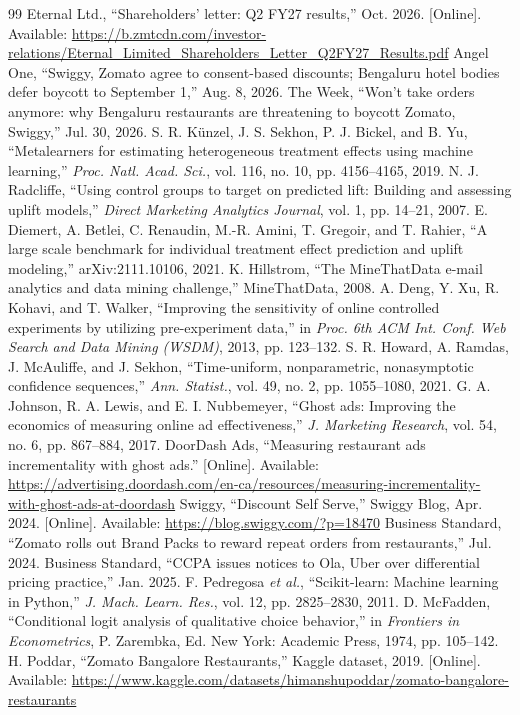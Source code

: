 \documentclass[conference]{IEEEtran}
\begin{document}
\begin{thebibliography}{99}
 Eternal Ltd., ``Shareholders' letter: Q2 FY27 results,'' Oct. 2026. [Online]. Available: \url{https://b.zmtcdn.com/investor-relations/Eternal_Limited_Shareholders_Letter_Q2FY27_Results.pdf}
 Angel One, ``Swiggy, Zomato agree to consent-based discounts; Bengaluru hotel bodies defer boycott to September 1,'' Aug. 8, 2026.
 The Week, ``Won't take orders anymore: why Bengaluru restaurants are threatening to boycott Zomato, Swiggy,'' Jul. 30, 2026.
 S. R. K\"unzel, J. S. Sekhon, P. J. Bickel, and B. Yu, ``Metalearners for estimating heterogeneous treatment effects using machine learning,'' \emph{Proc. Natl. Acad. Sci.}, vol. 116, no. 10, pp. 4156--4165, 2019.
 N. J. Radcliffe, ``Using control groups to target on predicted lift: Building and assessing uplift models,'' \emph{Direct Marketing Analytics Journal}, vol. 1, pp. 14--21, 2007.
 E. Diemert, A. Betlei, C. Renaudin, M.-R. Amini, T. Gregoir, and T. Rahier, ``A large scale benchmark for individual treatment effect prediction and uplift modeling,'' arXiv:2111.10106, 2021.
 K. Hillstrom, ``The MineThatData e-mail analytics and data mining challenge,'' MineThatData, 2008.
 A. Deng, Y. Xu, R. Kohavi, and T. Walker, ``Improving the sensitivity of online controlled experiments by utilizing pre-experiment data,'' in \emph{Proc. 6th ACM Int. Conf. Web Search and Data Mining (WSDM)}, 2013, pp. 123--132.
 S. R. Howard, A. Ramdas, J. McAuliffe, and J. Sekhon, ``Time-uniform, nonparametric, nonasymptotic confidence sequences,'' \emph{Ann. Statist.}, vol. 49, no. 2, pp. 1055--1080, 2021.
 G. A. Johnson, R. A. Lewis, and E. I. Nubbemeyer, ``Ghost ads: Improving the economics of measuring online ad effectiveness,'' \emph{J. Marketing Research}, vol. 54, no. 6, pp. 867--884, 2017.
 DoorDash Ads, ``Measuring restaurant ads incrementality with ghost ads.'' [Online]. Available: \url{https://advertising.doordash.com/en-ca/resources/measuring-incrementality-with-ghost-ads-at-doordash}
 Swiggy, ``Discount Self Serve,'' Swiggy Blog, Apr. 2024. [Online]. Available: \url{https://blog.swiggy.com/?p=18470}
 Business Standard, ``Zomato rolls out Brand Packs to reward repeat orders from restaurants,'' Jul. 2024.
 Business Standard, ``CCPA issues notices to Ola, Uber over differential pricing practice,'' Jan. 2025.
 F. Pedregosa \emph{et al.}, ``Scikit-learn: Machine learning in Python,'' \emph{J. Mach. Learn. Res.}, vol. 12, pp. 2825--2830, 2011.
 D. McFadden, ``Conditional logit analysis of qualitative choice behavior,'' in \emph{Frontiers in Econometrics}, P. Zarembka, Ed. New York: Academic Press, 1974, pp. 105--142.
 H. Poddar, ``Zomato Bangalore Restaurants,'' Kaggle dataset, 2019. [Online]. Available: \url{https://www.kaggle.com/datasets/himanshupoddar/zomato-bangalore-restaurants}
\end{thebibliography}
\end{document}
